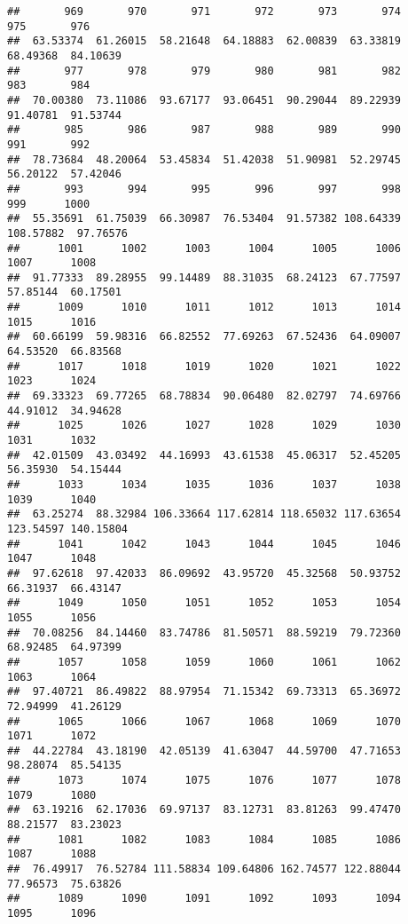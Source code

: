 \documentclass[
]{article}
\begin{document}
\begin{verbatim}
##       969       970       971       972       973       974       975       976 
##  63.53374  61.26015  58.21648  64.18883  62.00839  63.33819  68.49368  84.10639 
##       977       978       979       980       981       982       983       984 
##  70.00380  73.11086  93.67177  93.06451  90.29044  89.22939  91.40781  91.53744 
##       985       986       987       988       989       990       991       992 
##  78.73684  48.20064  53.45834  51.42038  51.90981  52.29745  56.20122  57.42046 
##       993       994       995       996       997       998       999      1000 
##  55.35691  61.75039  66.30987  76.53404  91.57382 108.64339 108.57882  97.76576 
##      1001      1002      1003      1004      1005      1006      1007      1008 
##  91.77333  89.28955  99.14489  88.31035  68.24123  67.77597  57.85144  60.17501 
##      1009      1010      1011      1012      1013      1014      1015      1016 
##  60.66199  59.98316  66.82552  77.69263  67.52436  64.09007  64.53520  66.83568 
##      1017      1018      1019      1020      1021      1022      1023      1024 
##  69.33323  69.77265  68.78834  90.06480  82.02797  74.69766  44.91012  34.94628 
##      1025      1026      1027      1028      1029      1030      1031      1032 
##  42.01509  43.03492  44.16993  43.61538  45.06317  52.45205  56.35930  54.15444 
##      1033      1034      1035      1036      1037      1038      1039      1040 
##  63.25274  88.32984 106.33664 117.62814 118.65032 117.63654 123.54597 140.15804 
##      1041      1042      1043      1044      1045      1046      1047      1048 
##  97.62618  97.42033  86.09692  43.95720  45.32568  50.93752  66.31937  66.43147 
##      1049      1050      1051      1052      1053      1054      1055      1056 
##  70.08256  84.14460  83.74786  81.50571  88.59219  79.72360  68.92485  64.97399 
##      1057      1058      1059      1060      1061      1062      1063      1064 
##  97.40721  86.49822  88.97954  71.15342  69.73313  65.36972  72.94999  41.26129 
##      1065      1066      1067      1068      1069      1070      1071      1072 
##  44.22784  43.18190  42.05139  41.63047  44.59700  47.71653  98.28074  85.54135 
##      1073      1074      1075      1076      1077      1078      1079      1080 
##  63.19216  62.17036  69.97137  83.12731  83.81263  99.47470  88.21577  83.23023 
##      1081      1082      1083      1084      1085      1086      1087      1088 
##  76.49917  76.52784 111.58834 109.64806 162.74577 122.88044  77.96573  75.63826 
##      1089      1090      1091      1092      1093      1094      1095      1096 

\end{verbatim}
\end{document}
